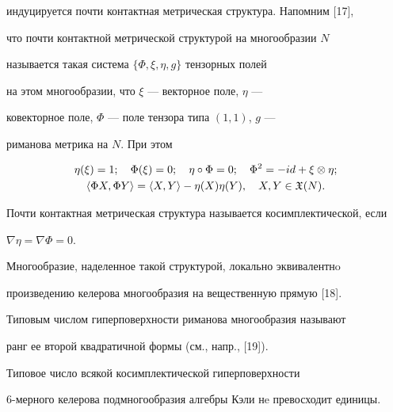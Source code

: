 индуцируется почти контактная метрическая структура. Напомним [17], 


что почти контактной метрической структурой на многообразии $N$ 


называется такая система $\{\Phi,\xi,\eta, g \}$ тензорных полей 


на этом многообразии, что $\xi$ --- векторное поле, $\eta$ --- 


ковекторное поле, $\Phi$ --- поле тензора типа $(1,1)$, $g$ --- 


риманова метрика на $N$. При этом


\begin{gather*}


\eta(\xi)=1; \quad \Phi(\xi)=0; \quad \eta \circ


\Phi=0; \quad \Phi^2=- i d+ \xi \otimes \eta; \\


\langle\Phi X,\Phi Y\rangle =\langle X,Y\rangle - \eta(X)\eta(Y), 


\quad X,Y \in \frak X(N).


\end{gather*}


Почти контактная метрическая структура называется косимплектической, если


$\nabla\eta=\nabla\Phi=0$.


Многообразие, наделенное такой структурой, локально эквивалентнo 


произведению келерова многообразия на вещественную прямую [18].


Типовым числом гиперповерхности риманова многообразия называют 


ранг ее второй квадратичной формы (см., напр., [19]).





\begin{thm}


Типовое число всякой косимплектической гиперповерхности 


$6$-мерного келерова подмногообразия алгебры Кэли нe превосходит единицы.


\end{thm}





